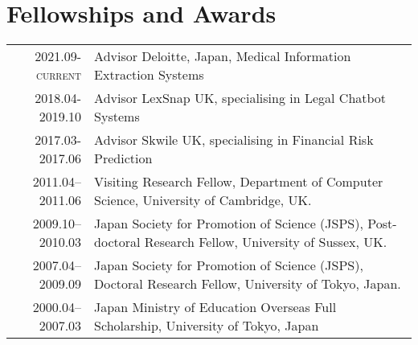 \documentclass[a4paper,11pt]{article}
\begin{document}
\section{Fellowships and Awards}
\begin{tabular}{r p{11cm}}
 \textsc{2021.09-current} & Advisor Deloitte, Japan, Medical Information Extraction Systems\\
\textsc{2018.04-2019.10} & Advisor LexSnap UK, specialising in Legal Chatbot Systems\\
\textsc{2017.03-2017.06} & Advisor Skwile UK, specialising in Financial Risk Prediction \\
\textsc{2011.04--2011.06} & Visiting Research Fellow, Department of Computer Science, University of Cambridge, UK. \\
\textsc{2009.10--2010.03} & Japan Society for Promotion of Science (JSPS), Post-doctoral Research Fellow, University of Sussex, UK. \\
\textsc{2007.04--2009.09} & Japan Society for Promotion of Science (JSPS), Doctoral Research Fellow, University of Tokyo, Japan.\\
\textsc{2000.04--2007.03} & Japan Ministry of Education Overseas Full Scholarship, University of Tokyo, Japan
\end{tabular}



\end{document}
